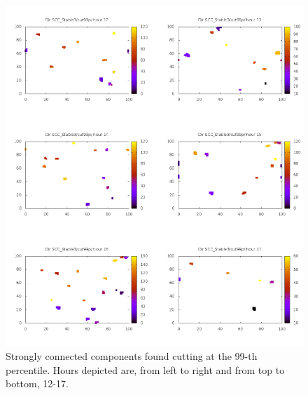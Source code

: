 \documentclass[12pt,a4paper]{article}
\begin{document}
\begin{figure}[H]
\includegraphics[scale=0.8]{tarjan3.png}
\caption{Strongly connected components found cutting at the 99-th percentile. Hours depicted are, from left to right and from top to bottom, 12-17.}
\label{fig:tarjan3}
\end{figure}
\end{document}
